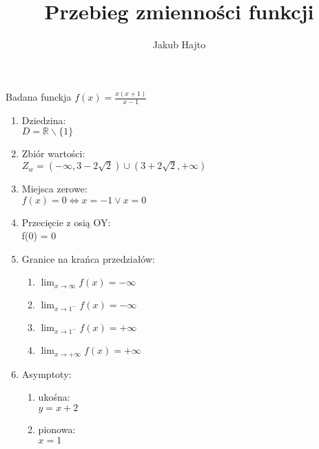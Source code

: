 \documentclass[11pt]{scrartcl}
\title{Przebieg zmienności funkcji}
\author{Jakub Hajto}
\begin{document}
	\maketitle
	\begin{center}
	Badana funckja $ f(x) = \frac{x(x+1)}{x-1} $
	\end{center}
	\begin{enumerate}  
		\item Dziedzina: \\
			$ D = \mathbb{R} \backslash \{1\} $
		\item Zbiór wartości: \\
			$ Z_w = (-\infty, 3 - 2\sqrt{2}) \cup (3 + 2\sqrt{2}, + \infty) $
		\item Miejsca zerowe: \\
			$ f(x) = 0 \Longleftrightarrow x = -1 \vee x = 0 $
		\item Przecięcie z osią OY: \\
			f(0) = 0
		\item Granice na krańca przedziałów:
			\begin{enumerate}
				\item $ \displaystyle\lim_{x\to\infty} f(x) = -\infty $
				\item $ \displaystyle \lim_{x\to1^-} f(x) = -\infty $
				\item $ \displaystyle\lim_{x\to1^-} f(x) = +\infty $
				\item $ \displaystyle\lim_{x\to+\infty} f(x) = +\infty $
			\end{enumerate}
		\item Asymptoty:
			\begin{enumerate}
				\item ukośna: \\
					$ y = x + 2$
				\item pionowa: \\
					$ x=1 $
			\end{enumerate}
			
	\end{enumerate}
	
\end{document}
